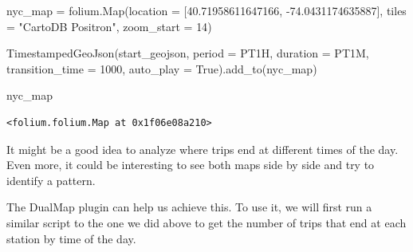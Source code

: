 \documentclass[
  letterpaper,
  DIV=11,
  numbers=noendperiod]{scrreprt}
\newenvironment{Shaded}{\begin{snugshade}}{\end{snugshade}}
\newcommand{\DecValTok}[1]{\textcolor[rgb]{0.68,0.00,0.00}{#1}}
\newcommand{\FloatTok}[1]{\textcolor[rgb]{0.68,0.00,0.00}{#1}}
\newcommand{\NormalTok}[1]{\textcolor[rgb]{0.00,0.23,0.31}{#1}}
\newcommand{\OperatorTok}[1]{\textcolor[rgb]{0.37,0.37,0.37}{#1}}
\newcommand{\StringTok}[1]{\textcolor[rgb]{0.13,0.47,0.30}{#1}}
\newcommand{\VariableTok}[1]{\textcolor[rgb]{0.07,0.07,0.07}{#1}}
\begin{document}
\begin{Shaded}
\begin{Highlighting}[]
\NormalTok{nyc\_map }\OperatorTok{=}\NormalTok{ folium.Map(location }\OperatorTok{=}\NormalTok{ [}\FloatTok{40.71958611647166}\NormalTok{, }\OperatorTok{{-}}\FloatTok{74.0431174635887}\NormalTok{],}
\NormalTok{                    tiles }\OperatorTok{=} \StringTok{"CartoDB Positron"}\NormalTok{,}
\NormalTok{                    zoom\_start }\OperatorTok{=} \DecValTok{14}\NormalTok{)}

\NormalTok{TimestampedGeoJson(start\_geojson,}
\NormalTok{                  period }\OperatorTok{=} \StringTok{\textquotesingle{}PT1H\textquotesingle{}}\NormalTok{,}
\NormalTok{                  duration }\OperatorTok{=} \StringTok{\textquotesingle{}PT1M\textquotesingle{}}\NormalTok{,}
\NormalTok{                  transition\_time }\OperatorTok{=} \DecValTok{1000}\NormalTok{,}
\NormalTok{                  auto\_play }\OperatorTok{=} \VariableTok{True}\NormalTok{).add\_to(nyc\_map)}

\NormalTok{nyc\_map}
\end{Highlighting}
\end{Shaded}

\begin{verbatim}
<folium.folium.Map at 0x1f06e08a210>
\end{verbatim}

It might be a good idea to analyze where trips end at different times of
the day. Even more, it could be interesting to see both maps side by
side and try to identify a pattern.

The DualMap plugin can help us achieve this. To use it, we will first
run a similar script to the one we did above to get the number of trips
that end at each station by time of the day.
\end{document}
